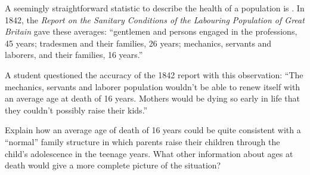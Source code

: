 

A seemingly straightforward statistic to describe the health of a population
is .  In 1842, the {\em Report on the
Sanitary Conditions of the Labouring Population of Great Britain}
gave these averages: ``gentlemen and persons engaged in the
professions, 45 years; tradesmen and their families, 26 years;
mechanics, servants and laborers, and their families, 16 years.''

A student questioned the accuracy of the 1842 report with this
observation: ``The mechanics, servants and laborer population wouldn't
be able to renew itself with an average age at death of 16 years.
Mothers would be dying so early in life that they couldn't possibly
raise their kids.''

Explain how an average age of death of 16 years could be quite
consistent with a ``normal'' family structure in which parents raise
their children through the child's adolescence in the teenage years.  
What other
information about ages at death would give a more complete picture of
the situation? \TextEntry